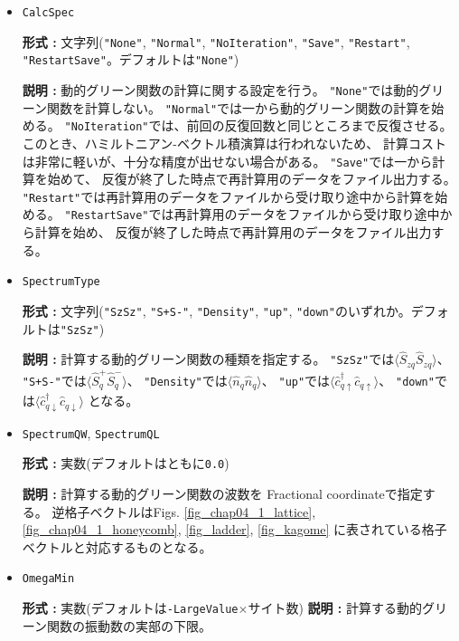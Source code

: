 \begin{itemize}
\item \verb|CalcSpec|
  
  {\bf 形式 :} 文字列(\verb|"None"|, \verb|"Normal"|, \verb|"NoIteration"|,  
  \verb|"Save"|, \verb|"Restart"|, \verb|"RestartSave"|。デフォルトは\verb|"None"|)

  {\bf 説明 :} 動的グリーン関数の計算に関する設定を行う。
  \verb|"None"|では動的グリーン関数を計算しない。
  \verb|"Normal"|では一から動的グリーン関数の計算を始める。
  \verb|"NoIteration"|では、前回の反復回数と同じところまで反復させる。
  このとき、ハミルトニアン-ベクトル積演算は行われないため、
  計算コストは非常に軽いが、十分な精度が出せない場合がある。
  \verb|"Save"|では一から計算を始めて、
  反復が終了した時点で再計算用のデータをファイル出力する。
  \verb|"Restart"|では再計算用のデータをファイルから受け取り途中から計算を始める。
  \verb|"RestartSave"|では再計算用のデータをファイルから受け取り途中から計算を始め、
  反復が終了した時点で再計算用のデータをファイル出力する。

\item \verb|SpectrumType|
  
  {\bf 形式 :} 文字列(\verb|"SzSz"|, \verb|"S+S-"|, \verb|"Density"|,  
  \verb|"up"|, \verb|"down"|のいずれか。デフォルトは\verb|"SzSz"|)

  {\bf 説明 :} 計算する動的グリーン関数の種類を指定する。
  \verb|"SzSz"|では$\langle {\hat S}_{z q} {\hat S}_{z q}\rangle$、
  \verb|"S+S-"|では$\langle {\hat S}^{+}_{q} {\hat S}^{-}_{q}\rangle$、
  \verb|"Density"|では$\langle {\hat n}_{q} {\hat n}_{q}\rangle$、
  \verb|"up"|では$\langle {\hat c}^{\dagger}_{q \uparrow} {\hat c}_{q \uparrow}\rangle$、
  \verb|"down"|では$\langle {\hat c}^{\dagger}_{q \downarrow} {\hat c}_{q \downarrow}\rangle$
  となる。

\item \verb|SpectrumQW|, \verb|SpectrumQL|
  
  {\bf 形式 :} 実数(デフォルトはともに\verb|0.0|)

  {\bf 説明 :} 計算する動的グリーン関数の波数を
  Fractional coordinateで指定する。
  逆格子ベクトルはFigs.
  \ref{fig_chap04_1_lattice}, \ref{fig_chap04_1_honeycomb},
  \ref{fig_ladder}, \ref{fig_kagome}
  に表されている格子ベクトルと対応するものとなる。

\item \verb|OmegaMin|

    {\bf 形式 :} 実数(デフォルトは\verb|-LargeValue|$\times$サイト数)
    {\bf 説明 :} 計算する動的グリーン関数の振動数の実部の下限。
    

\end{itemize}

